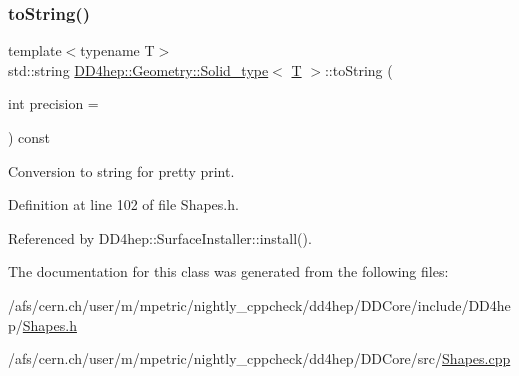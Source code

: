 \hypertarget{class_d_d4hep_1_1_geometry_1_1_solid__type_a670931e69f6f3dbf1a916e2ba2dd42d6}{}\label{class_d_d4hep_1_1_geometry_1_1_solid__type_a670931e69f6f3dbf1a916e2ba2dd42d6} 
\subsubsection{\texorpdfstring{to\+String()}{toString()}}
{\footnotesize\ttfamily template$<$typename T$>$ \\
std\+::string \hyperlink{class_d_d4hep_1_1_geometry_1_1_solid__type}{D\+D4hep\+::\+Geometry\+::\+Solid\+\_\+type}$<$ \hyperlink{class_t}{T} $>$\+::to\+String (\begin{DoxyParamCaption}\item[{int}]{precision = {} }\end{DoxyParamCaption}) const\hspace{0.3cm}{\ttfamily [inline]}}



Conversion to string for pretty print. 



Definition at line 102 of file Shapes.\+h.



Referenced by D\+D4hep\+::\+Surface\+Installer\+::install().



The documentation for this class was generated from the following files\+:\begin{DoxyCompactItemize}
\item 
/afs/cern.\+ch/user/m/mpetric/nightly\+\_\+cppcheck/dd4hep/\+D\+D\+Core/include/\+D\+D4hep/\hyperlink{_shapes_8h}{Shapes.\+h}\item 
/afs/cern.\+ch/user/m/mpetric/nightly\+\_\+cppcheck/dd4hep/\+D\+D\+Core/src/\hyperlink{_shapes_8cpp}{Shapes.\+cpp}\end{DoxyCompactItemize}
